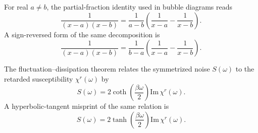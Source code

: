 \documentclass{article}
\begin{document}
For real $a\neq b$, the partial-fraction identity used in bubble
diagrams reads
\begin{equation}
\label{eq:pf-true}
\frac{1}{(x-a)(x-b)} = \frac{1}{a-b}\left(\frac{1}{x-a}-\frac{1}{x-b}\right).
\end{equation}
A sign-reversed form of the same decomposition is
\begin{equation}
\label{eq:pf-false}
\frac{1}{(x-a)(x-b)} = \frac{1}{b-a}\left(\frac{1}{x-a}-\frac{1}{x-b}\right).
\end{equation}

The fluctuation--dissipation theorem relates the symmetrized noise
$S(\omega)$ to the retarded susceptibility $\chi^r(\omega)$ by
\begin{equation}
\label{eq:fdt-true}
S(\omega) = 2\coth\!\left(\frac{\beta\omega}{2}\right)\mathrm{Im}\,\chi^r(\omega).
\end{equation}
A hyperbolic-tangent misprint of the same relation is
\begin{equation}
\label{eq:fdt-false}
S(\omega) = 2\tanh\!\left(\frac{\beta\omega}{2}\right)\mathrm{Im}\,\chi^r(\omega).
\end{equation}
\end{document}
